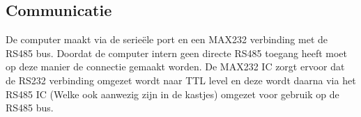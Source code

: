 \subsection{Communicatie}
De computer maakt via de serie\"{e}le port en een MAX232 verbinding met de RS485 bus. Doordat de computer intern geen directe RS485 toegang heeft moet op deze manier de connectie gemaakt worden. De MAX232 IC zorgt ervoor dat de RS232 verbinding omgezet wordt naar TTL level en deze wordt daarna via het RS485 IC (Welke ook aanwezig zijn in de kastjes) omgezet voor gebruik op de RS485 bus.
